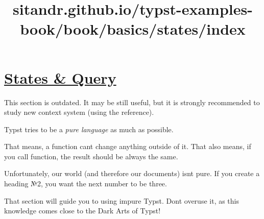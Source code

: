 \title{sitandr.github.io/typst-examples-book/book/basics/states/index}

\section{\texorpdfstring{\hyperref[states--query]{States \&
Query}}{States \& Query}}\label{states--query}

This section is outdated. It may be still useful, but it is strongly
recommended to study new context system (using the reference).

Typst tries to be a \emph{pure language} as much as possible.

That means, a function can\textquotesingle t change anything outside of
it. That also means, if you call function, the result should be always
the same.

Unfortunately, our world (and therefore our documents)
isn\textquotesingle t pure. If you create a heading №2, you want the
next number to be three.

That section will guide you to using impure Typst. Don\textquotesingle t
overuse it, as this knowledge comes close to the Dark Arts of Typst!
